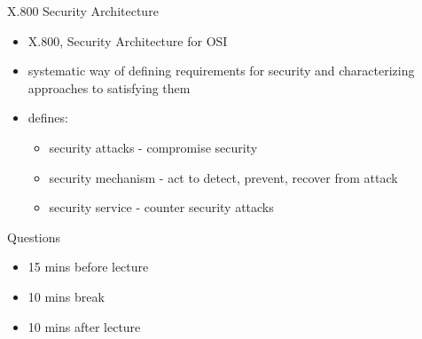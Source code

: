 \documentclass{beamer}
\begin{document}
\begin{frame}{X.800 Security Architecture}
  \begin{itemize}
    \item X.800, Security Architecture for OSI 
    \item systematic way of defining requirements for 
    security and characterizing approaches to 
    satisfying them 
    \item defines: 
      \begin{itemize}
        \item security attacks - compromise security 
        \item security mechanism - act to detect, prevent, 
        recover from attack 
        \item security service - counter security attacks 
      \end{itemize}
  \end{itemize}
\end{frame}

\begin{frame}{Questions}
  \begin{itemize}
    \item 15 mins before lecture
    \item 10 mins break
    \item 10 mins after lecture
  \end{itemize}
\end{frame}
\end{document}

